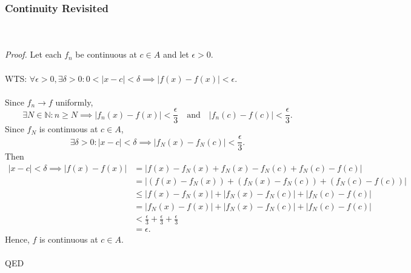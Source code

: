 \documentclass{article}
\begin{document}
           \subsubsection{Continuity Revisited}
           \\ \\
           \textit{Proof.} Let each $f_n$ be continuous at $ c \in A$ and let $\epsilon >0$.
           \\ \\
           WTS: $\forall \epsilon >0, \exists \delta>0: 0<|x-c|<\delta \implies |f(x)-f(x)|<\epsilon.$
           \\ \\
           Since $f_n \to f$ uniformly,
           \begin{equation*}
               \exists N \in \mathbb{N}: n \geq N \implies |f_n(x) - f(x)| < \frac{\epsilon}{3} \quad \text{and} \quad |f_n(c)-f(c)| < \frac{\epsilon}{3}.
           \end{equation*}
           Since $f_N$ is continuous at $c \in A$,
           \begin{equation*}
               \exists \delta > 0: |x-c| < \delta \implies |f_N(x)-f_N(c)|< \frac{\epsilon}{3}.
           \end{equation*}
           Then
           \begin{align*}
               |x-c|<\delta \implies |f(x)-f(x)| &= |f(x)-f_N(x)+f_N(x)-f_N(c)+f_N(c)-f(c)| \\
               &= |(f(x)-f_N(x))+(f_N(x)-f_N(c))+(f_N(c)-f(c))| \\
               &\leq |f(x)-f_N(x)| + |f_N(x)-f_N(c)| + |f_N(c)-f(c)| \\
               &= |f_N(x)-f(x)| + |f_N(x)-f_N(c)| + |f_N(c)-f(c)| \\
               &< \frac{\epsilon}{3} + \frac{\epsilon}{3} + \frac{\epsilon}{3} \\
               &= \epsilon.
           \end{align*}
           Hence, $f$ is continuous at $c \in A$.
           \\ \\
           QED
           \\ \\
           
\end{document}
